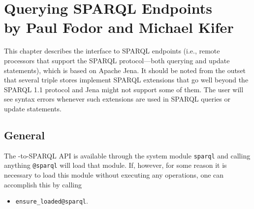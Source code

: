 \chapter[Querying SPARQL Endpoints]
{Querying SPARQL Endpoints\\
  {\Large by Paul Fodor and Michael Kifer}}


This chapter describes the \ERGO interface to 
SPARQL endpoints (i.e., remote processors that
support the SPARQL protocol---both querying and update statements),
which is based on Apache Jena. It should be noted from the outset
that several triple stores
implement SPARQL extensions that go well beyond the SPARQL 1.1 protocol and
Jena might not support some of them. The user will see syntax errors
whenever such extensions are used in SPARQL queries or update statements.

\section{General}

The \ERGO-to-SPARQL API is available through the \ERGO system module
\texttt{\bs{}sparql}
and calling anything \texttt{@\bs{}sparql}  will load that module. If, however, for
some reason it is necessary to load this module without executing any
operations, one can accomplish this by calling 
\begin{itemize}
\item  \texttt{ensure\_loaded@\bs{}sparql}. 
\end{itemize}

